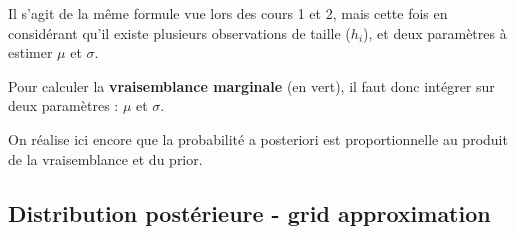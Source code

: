 \documentclass[
  a4paper,11pt,twoside,onecolumn,openright,final,oldfontcommands]{memoir}
\theoremstyle{definition}
\theoremstyle{definition}
\theoremstyle{definition}
\theoremstyle{remark}
\begin{document}
Il s'agit de la même formule vue lors des cours 1 et 2, mais cette fois en considérant qu'il existe plusieurs observations de taille (\(h_{i}\)), et deux paramètres à estimer \(\mu\) et \(\sigma\).

Pour calculer la \textbf{vraisemblance marginale} (en vert), il faut donc intégrer sur deux paramètres : \(\mu\) et \(\sigma\).

On réalise ici encore que la probabilité a posteriori est proportionnelle au produit de la vraisemblance et du prior.

\hypertarget{distribution-postuxe9rieure---grid-approximation}{%
\subsection{Distribution postérieure - grid approximation}\label{distribution-postuxe9rieure---grid-approximation}}
\end{document}
